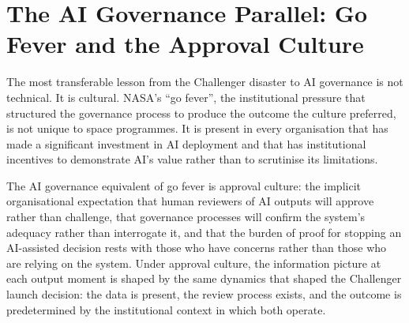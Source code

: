 \scenebreak

\section{The AI Governance Parallel: Go Fever and the Approval Culture}

The most transferable lesson from the Challenger disaster to AI governance is not technical. It is cultural. NASA's ``go fever'', the institutional pressure that structured the governance process to produce the outcome the culture preferred, is not unique to space programmes. It is present in every organisation that has made a significant investment in AI deployment and that has institutional incentives to demonstrate AI's value rather than to scrutinise its limitations.

The AI governance equivalent of go fever is approval culture: the implicit organisational expectation that human reviewers of AI outputs will approve rather than challenge, that governance processes will confirm the system's adequacy rather than interrogate it, and that the burden of proof for stopping an AI-assisted decision rests with those who have concerns rather than those who are relying on the system. Under approval culture, the information picture at each output moment is shaped by the same dynamics that shaped the Challenger launch decision: the data is present, the review process exists, and the outcome is predetermined by the institutional context in which both operate.


